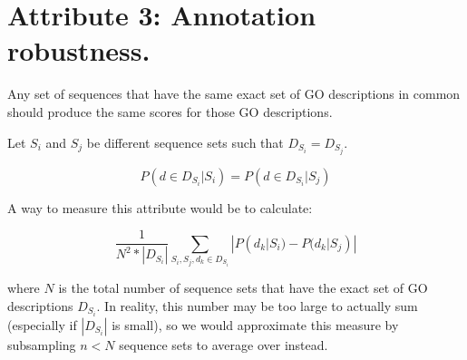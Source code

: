 \documentclass{specification}
\begin{document}
\section*{Attribute 3: Annotation robustness.}

Any set of sequences that have the same exact set of GO descriptions in common should produce the same scores for those GO descriptions.

Let $S_i$ and $S_j$ be different sequence sets such that $D_{S_i} = D_{S_j}$.

\[P(d \in D_{S_i} | S_i) = P(d \in D_{S_i} | S_j)\]

A way to measure this attribute would be to calculate: 

\[\frac{1}{N^{2}*|D_{S_i}|}\sum_{S_i, S_j, d_{k} \in D_{S_i}} |P(d_k | S_i) - P(d_k | S_j)|\]

where $N$ is the total number of sequence sets that have the exact set of GO descriptions $D_{S_i}$. In reality, this number may be too large to actually sum (especially if $|D_{S_i}|$ is small), so we would approximate this measure by subsampling $n < N$ sequence sets to average over instead. 
 
%
%



\printbibliography
\end{document}
